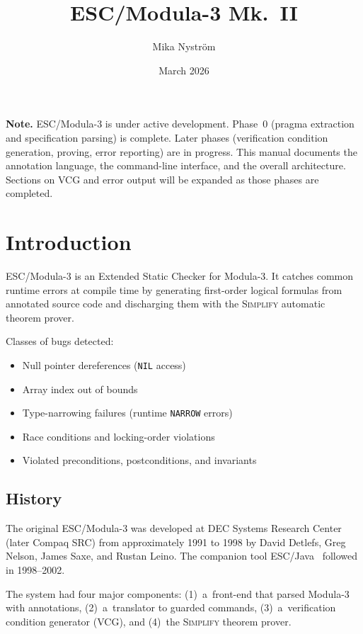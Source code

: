 \documentclass[11pt]{article}
\title{ESC/Modula-3 Mk.\ II}
\author{Mika Nystr\"om}
\date{March 2026}
\newcommand{\escm}{ESC/Modula-3}
\newcommand{\simplify}{\textsc{Simplify}}
\newcommand{\m}[1]{\texttt{#1}}
\begin{document}
\maketitle

\tableofcontents

\bigskip
\noindent
\textbf{Note.}  \escm{} is under active development.
Phase~0 (pragma extraction and specification parsing) is complete.
Later phases (verification condition generation, proving, error
reporting) are in progress.  This manual documents the annotation
language, the command-line interface, and the overall architecture.
Sections on VCG and error output will be expanded as those phases
are completed.

\section{Introduction}
\label{sec:intro}

\escm{} is an Extended Static Checker for Modula-3.  It catches common
runtime errors at compile time by generating first-order logical
formulas from annotated source code and discharging them with the
\simplify{} automatic theorem prover.

Classes of bugs detected:
\begin{itemize}[nosep]
  \item Null pointer dereferences (\m{NIL} access)
  \item Array index out of bounds
  \item Type-narrowing failures (runtime \m{NARROW} errors)
  \item Race conditions and locking-order violations
  \item Violated preconditions, postconditions, and invariants
\end{itemize}

\subsection{History}

The original ESC/Modula-3 was developed at DEC Systems Research Center
(later Compaq SRC) from approximately 1991 to 1998 by David Detlefs,
Greg Nelson, James Saxe, and Rustan Leino.  The companion tool
ESC/Java~\cite{flanagan:pldi02} followed in 1998--2002.

The system had four major components: (1)~a~front-end that parsed
Modula-3 with annotations, (2)~a~translator to guarded commands,
(3)~a~verification condition generator (VCG), and (4)~the \simplify{}
theorem prover.
\end{document}
